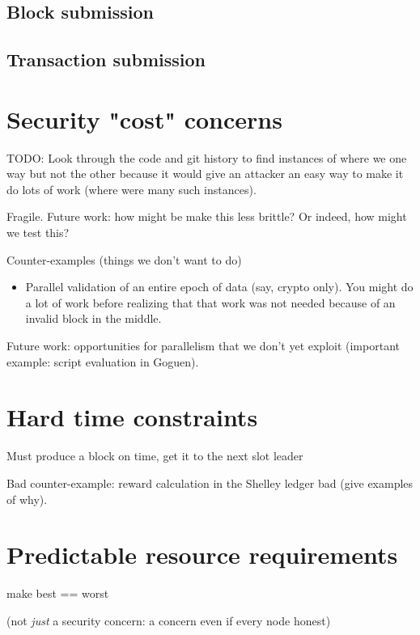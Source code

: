 \subsection{Block submission}
\label{network:blocksubmission}

\subsection{Transaction submission}
\label{network:txsubmission}

\section{Security "cost" concerns}

TODO: Look through the code and git history to find instances of where we
one way but not the other because it would give an attacker an easy way to
make it do lots of work (where were many such instances).

Fragile. Future work: how might be make this less brittle?
Or indeed, how might we test this?

Counter-examples (things we don't want to do)

\begin{itemize}
\item Parallel validation of an entire epoch of data (say, crypto only).
You might do a lot of work before realizing that that work was not needed because
of an invalid block in the middle.
\end{itemize}

Future work: opportunities for parallelism that we don't yet exploit
(important example: script evaluation in Goguen).

\section{Hard time constraints}

Must produce a block on time, get it to the next slot leader

Bad counter-example: reward calculation in the Shelley ledger bad
(give examples of why).

\section{Predictable resource requirements}

make best == worst

(not \emph{just} a security concern: a concern even if every node honest)
